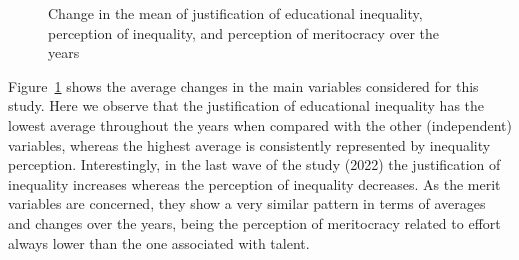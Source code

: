 \documentclass[
]{article}
\begin{document}
\begin{figure}[H]


\caption{\label{fig-means}Change in the mean of justification of
educational inequality, perception of inequality, and perception of
meritocracy over the years}

\end{figure}%

Figure~\ref{fig-means} shows the average changes in the main variables
considered for this study. Here we observe that the justification of
educational inequality has the lowest average throughout the years when
compared with the other (independent) variables, whereas the highest
average is consistently represented by inequality perception.
Interestingly, in the last wave of the study (2022) the justification of
inequality increases whereas the perception of inequality decreases. As
the merit variables are concerned, they show a very similar pattern in
terms of averages and changes over the years, being the perception of
meritocracy related to effort always lower than the one associated with
talent.
\end{document}
